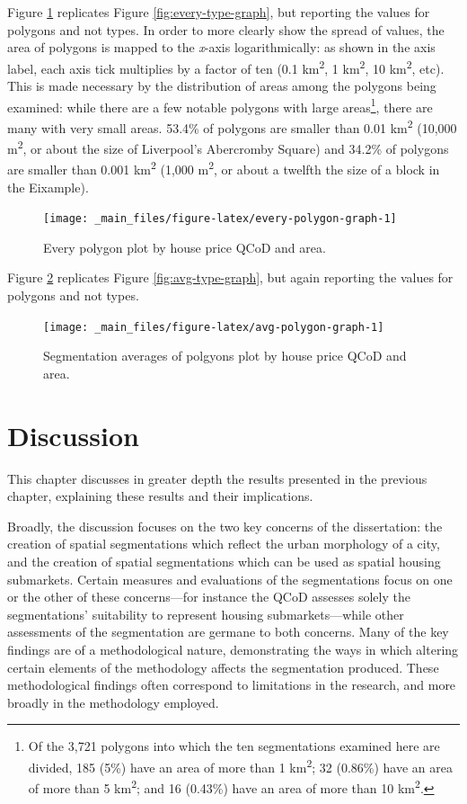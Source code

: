 \documentclass[a4paper, nobind]{templates/ociamthesis}
\begin{document}
Figure \ref{fig:every-polygon-graph} replicates Figure \ref{fig:every-type-graph}, but reporting the values for polygons and not types. In order to more clearly show the spread of values, the area of polygons is mapped to the \emph{x}-axis logarithmically: as shown in the axis label, each axis tick multiplies by a factor of ten (0.1 km\textsuperscript{2}, 1 km\textsuperscript{2}, 10 km\textsuperscript{2}, etc). This is made necessary by the distribution of areas among the polygons being examined: while there are a few notable polygons with large areas\footnote{Of the 3,721 polygons into which the ten segmentations examined here are divided, 185 (5\%) have an area of more than 1 km\textsuperscript{2}; 32 (0.86\%) have an area of more than 5 km\textsuperscript{2}; and 16 (0.43\%) have an area of more than 10 km\textsuperscript{2}.}, there are many with very small areas. 53.4\% of polygons are smaller than 0.01 km\textsuperscript{2} (10,000 m\textsuperscript{2}, or about the size of Liverpool's Abercromby Square) and 34.2\% of polygons are smaller than 0.001 km\textsuperscript{2} (1,000 m\textsuperscript{2}, or about a twelfth the size of a block in the Eixample).

\begin{figure}
\texttt{[image: \_main\_files/figure-latex/every-polygon-graph-1]} \caption{Every polygon plot by house price QCoD and area.}\label{fig:every-polygon-graph}
\end{figure}

Figure \ref{fig:avg-polygon-graph} replicates Figure \ref{fig:avg-type-graph}, but again reporting the values for polygons and not types.

\begin{figure}
\texttt{[image: \_main\_files/figure-latex/avg-polygon-graph-1]} \caption{Segmentation averages of polgyons plot by house price QCoD and area.}\label{fig:avg-polygon-graph}
\end{figure}

\hypertarget{discussion}{%
\chapter{Discussion}\label{discussion}}

\minitoc 

This chapter discusses in greater depth the results presented in the previous chapter, explaining these results and their implications.

Broadly, the discussion focuses on the two key concerns of the dissertation: the creation of spatial segmentations which reflect the urban morphology of a city, and the creation of spatial segmentations which can be used as spatial housing submarkets. Certain measures and evaluations of the segmentations focus on one or the other of these concerns---for instance the QCoD assesses solely the segmentations' suitability to represent housing submarkets---while other assessments of the segmentation are germane to both concerns. Many of the key findings are of a methodological nature, demonstrating the ways in which altering certain elements of the methodology affects the segmentation produced. These methodological findings often correspond to limitations in the research, and more broadly in the methodology employed.
\end{document}
